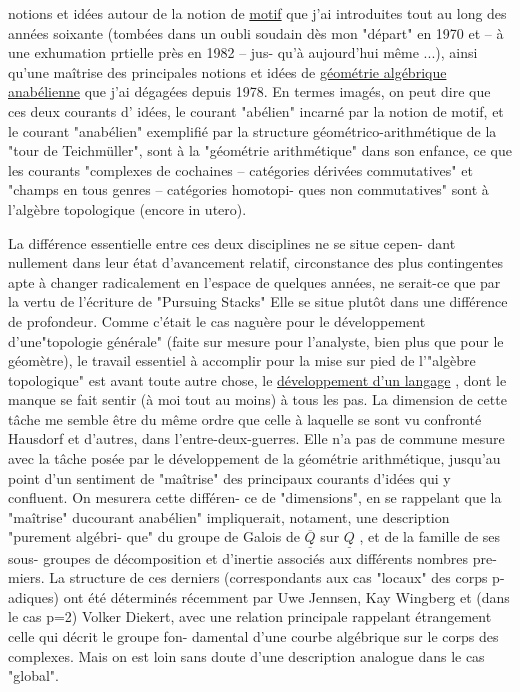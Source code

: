 notions et idées autour de la notion de \uline{motif}\hand{,} que j'ai introduites tout
au long des années soixante (tombées dans un oubli soudain dès mon 
"départ" en 1970 et -- à une exhumation prtielle près en 1982 -- jus-%
qu'à aujourd'hui même ...), ainsi qu'une maîtrise des principales 
notions et idées de \uline{géométrie algébrique anabélienne} que j'ai dégagées
depuis 1978. En termes imagés, on peut dire que ces deux courants d'
idées, le courant "abélien" incarné par la notion de motif, et le
courant "anabélien" exemplifié par la structure géométrico-arithmétique
de la "tour de Teichmüller", sont à la "géométrie arithmétique" dans son
enfance, ce que les  courants "complexes de cochaines -- catégories
dérivées commutatives" et "champs en tous genres -- catégories homotopi-%
ques non commutatives" sont à l'algèbre topologique\unsure{\hand{,}} (encore in utero).

\margin{\unsure{$\lfloor$}}La différence essentielle entre ces deux disciplines ne se situe cepen-%
dant nullement dans leur état d'avancement relatif, circonstance des
plus contingentes\hand{,} apte à changer radicalement en l'espace de quelques
années, ne serait-ce que par la vertu de l'écriture de "Pursuing Stacks"
Elle se situe plutôt dans une différence de profondeur. Comme c'était
le cas naguère pour le développement d'une"topologie générale" (faite
sur mesure pour l'analyste, bien plus que pour le géomètre), le travail
essentiel à accomplir pour la mise sur pied de l'"algèbre topologique"
est\hand{,} avant toute autre chose, le \uline{développement d'un langage} , dont le
manque se fait sentir (à moi tout au moins) à tous les pas. La dimension
de cette tâche me semble être du même ordre que celle à laquelle se sont
vu confronté Hausdorf et d'autres, dans l'entre-deux-guerres. Elle n'a
pas de commune mesure avec la tâche posée par le développement de la
géométrie arithmétique, jusqu'au point d'un sentiment de "maîtrise" des
principaux courants d'idées qui y confluent. On mesurera cette différen-%
ce de "dimensions", en se rappelant que la "maîtrise" ducourant
anabélien" impliquerait, notament, une description "purement algébri-%
que" du groupe de Galois de $\overline{\underline{Q}}$ sur $\underline{Q}$ , et de la famille de ses sous-%
groupes de décomposition et d'inertie associés aux différents nombres pre-%
miers. La structure de ces derniers  (correspondants aux cas
"locaux" des corps p-adiques) ont été déterminés récemment par 
Uwe Jennsen, Kay Wingberg et (dans le cas p=2) Volker Diekert, avec une
relation principale rappelant étrangement celle qui décrit le groupe fon-%
damental d'une courbe algébrique sur le corps des complexes. Mais on est
loin sans doute d'une description analogue dans le cas "global".

